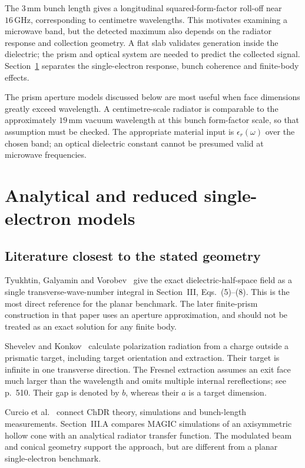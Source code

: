 \documentclass[11pt,a4paper]{article}
\newcommand{\unit}[1]{\,\mathrm{#1}}
\numberwithin{equation}{section}
\begin{document}
The \(3\unit{mm}\) bunch length gives a longitudinal squared-form-factor
roll-off near \(16\unit{GHz}\), corresponding to centimetre wavelengths.
This motivates examining a microwave band, but the detected maximum also
depends on the radiator response and collection geometry. A flat slab
validates generation inside the dielectric; the prism and optical system
are needed to predict the collected signal. Section~\ref{sec:analytical}
separates the single-electron response, bunch coherence and finite-body effects.

The prism aperture models discussed below are most useful when face dimensions
greatly exceed wavelength. A centimetre-scale radiator is comparable to the
approximately \(19\unit{mm}\) vacuum wavelength at this bunch form-factor
scale, so that assumption must be checked. The appropriate material input is
\(\epsilon_r(\omega)\) over the chosen band; an optical dielectric constant
cannot be presumed valid at microwave frequencies.

\section{Analytical and reduced single-electron models}
\label{sec:analytical}

\subsection{Literature closest to the stated geometry}

Tyukhtin, Galyamin and Vorobev~\cite{tyukhtin2021invertedprism}
give the exact dielectric-half-space field as a single transverse-wave-number
integral in Section~III, Eqs.~(5)--(8). This is the most direct reference
for the planar benchmark. The later finite-prism construction in that paper
uses an aperture approximation, and should not be treated as an exact
solution for any finite body.

Shevelev and Konkov~\cite{shevelev2014dielectrictarget} calculate polarization
radiation from a charge outside a prismatic target, including target
orientation and extraction. Their target is infinite in one transverse
direction. The Fresnel extraction assumes an exit face much larger than
the wavelength and omits multiple internal rereflections; see p.~510.
Their gap is denoted by \(b\), whereas their \(a\) is a target dimension.

Curcio et al.~\cite{curcio2020bunchlength} connect ChDR theory, simulations
and bunch-length measurements. Section~III.A compares MAGIC simulations of
an axisymmetric hollow cone with an analytical radiator transfer function.
The modulated beam and conical geometry support the approach, but are
different from a planar single-electron benchmark.
\end{document}
